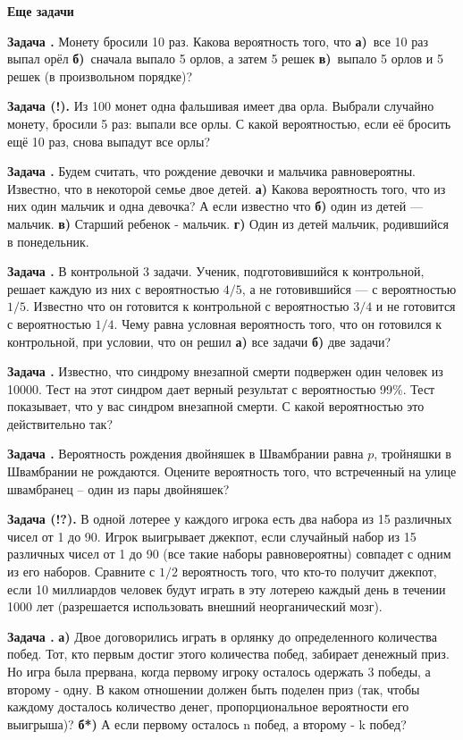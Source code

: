 \documentclass[11pt,a4paper]{article}
\newcounter{znum}
\newcommand{\z}[1]{\addtocounter{znum}{1} \textbf{Задача \arabic{znum}#1. }}
\renewcommand{\!}{\textcolor{red}{!}}
\begin{document}
\thispagestyle{empty}
\begin{center}
	\large
	\textbf{Еще задачи}
	\normalsize
\end{center}

\z{} Монету бросили 10 раз. Какова вероятность того, что \textbf{а)}~все 10 раз выпал орёл \textbf{б)}~сначала выпало 5 орлов, а затем 5 решек \textbf{в)}~выпало 5 орлов и 5 решек (в произвольном порядке)?

\z{ (!)} Из 100 монет одна фальшивая имеет два орла. Выбрали случайно монету, бросили 5 раз: выпали все орлы. С какой вероятностью, если её бросить ещё 10 раз, снова выпадут все орлы?

\z{} Будем считать, что рождение девочки и мальчика равновероятны. Известно, что в некоторой семье двое детей. \textbf{а)} Какова вероятность того, что из них один мальчик и одна девочка? А если известно что
\textbf{б)} один из детей — мальчик.
\textbf{в)} Старший ребенок - мальчик.
\textbf{г)} Один из детей мальчик, родившийся в понедельник.

\z{} В контрольной 3 задачи. Ученик, подготовившийся к контрольной, решает каждую из
них с вероятностью $4/5$, а не готовившийся --- с вероятностью $1/5$. Известно что он готовится к контрольной с вероятностью $3/4$ и не готовится с вероятностью $1/4$. Чему равна условная вероятность того, что он готовился к контрольной, при условии, что он решил \textbf{а)} все задачи \textbf{б)} две задачи?

\z{} Известно, что синдрому внезапной смерти подвержен один человек из 10000. Тест на этот синдром дает верный результат с вероятностью 99\%. Тест показывает, что у вас синдром внезапной смерти. С какой вероятностью это действительно так?

\z{} Вероятность рождения двойняшек в Швамбрании равна $p$, тройняшки в Швамбрании не рождаются.
Оцените вероятность того, что встреченный на улице швамбранец – один из пары двойняшек?

\z{ (!?)} В одной лотерее у каждого игрока есть два набора из 15 различных чисел от 1 до 90. Игрок выигрывает джекпот, если случайный набор из 15 различных чисел от 1 до 90 (все такие наборы равновероятны) совпадет с одним из его наборов. Сравните с $1/2$ вероятность того, что кто-то получит джекпот, если 10 миллиардов человек будут играть в эту лотерею каждый день в течении 1000 лет (разрешается использовать внешний неорганический мозг).

\z{} \textbf{а)} Двое договорились играть в орлянку до определенного количества побед. Тот, кто первым достиг этого количества побед, забирает денежный приз. Но игра была прервана, когда первому игроку осталось одержать 3 победы, а второму - одну. В каком отношении должен быть поделен приз (так, чтобы каждому досталось количество денег, пропорциональное вероятности его выигрыша)?
\textbf{б*)} А если первому осталось n побед, а второму - k побед?
\end{document}
